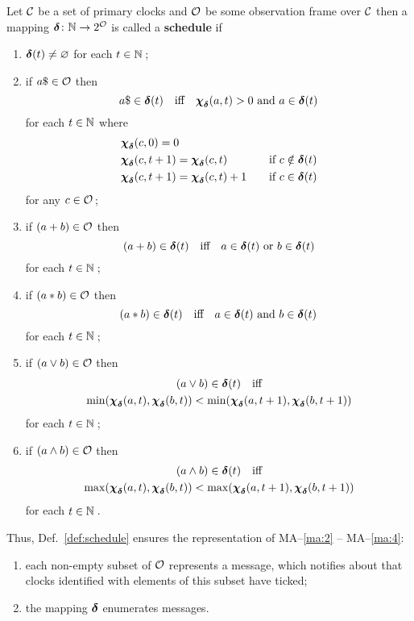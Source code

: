 \begin{definition}\label{def:schedule}
Let $\clocks$ be a set of primary clocks and $\clocks[o]$ be some observation frame over $\clocks$ then a mapping $\dELTA\colon\nat\to 2^{\clocks[o]}$ is called a {\bfseries schedule} if
\begin{enumerate}
\item
$\boldsymbol{\delta}(t)\neq\varnothing$ for each $t\in\nat$\,;
\item
if $a\$\in\clocks[o]$ then
\[
	a\$\in\dELTA(t)\quad\mbox{iff}\quad\cfg{\dELTA}(a,t)>0\ \mbox{and}
		\ a\in\dELTA(t)
\]
for each $t\in\nat$ where
\begin{align*}
	&\cfg{\dELTA}(c,0)=0\\
	&\cfg{\dELTA}(c,t+1)=\cfg{\dELTA}(c,t)&\mbox{if}\ c\notin\dELTA(t)\\
	&\cfg{\dELTA}(c,t+1)=\cfg{\dELTA}(c,t)+1\quad&\mbox{if}\ c\in\dELTA(t)
\end{align*}
for any $c\in\clocks[o]$\,;
\item
if $(a+b)\in\clocks[o]$ then
\[
	(a+b)\in\boldsymbol{\delta}(t)\quad\mbox{iff}\quad a\in\boldsymbol{\delta}(t)\ \mbox{or}\ b\in\boldsymbol{\delta}(t)
\]	
for each $t\in\nat$\,;
\item
if $(a\ast b)\in\clocks[o]$ then
\[
	(a\ast b)\in\boldsymbol{\delta}(t)\quad\mbox{iff}\quad a\in\boldsymbol{\delta}(t)\ \mbox{and}
		\ b\in\boldsymbol{\delta}(t)
\]
for each $t\in\nat$\,;
\item
if $(a\vee b)\in\clocks[o]$ then
\begin{multline*}
	(a\vee b)\in\boldsymbol{\delta}(t)\quad\mbox{iff}\\
		\min(\boldsymbol{\chi}_{\boldsymbol{\delta}}(a,t),\boldsymbol{\chi}_{\boldsymbol{\delta}}(b,t))<
		\min(\boldsymbol{\chi}_{\boldsymbol{\delta}}(a,t+1),\boldsymbol{\chi}_{\boldsymbol{\delta}}(b,t+1))
\end{multline*}
for each $t\in\nat$\,;
\item
if $(a\wedge b)\in\clocks[o]$ then
\begin{multline*}
	(a\wedge b)\in\boldsymbol{\delta}(t)\quad\mbox{iff}\\
		\max(\boldsymbol{\chi}_{\boldsymbol{\delta}}(a,t),\boldsymbol{\chi}_{\boldsymbol{\delta}}(b,t))<
		\max(\boldsymbol{\chi}_{\boldsymbol{\delta}}(a,t+1),\boldsymbol{\chi}_{\boldsymbol{\delta}}(b,t+1))
\end{multline*}
for each $t\in\nat$\,.
\end{enumerate}
\end{definition}
Thus, Def.~\ref{def:schedule} ensures the representation of MA--\ref{ma:2} -- MA--\ref{ma:4}:
\begin{enumerate}
\item
each non-empty subset of $\clocks[o]$ represents a message, which notifies about that clocks identified with elements of this subset have ticked;
\item
the mapping $\boldsymbol{\delta}$ enumerates messages. 
\end{enumerate}
